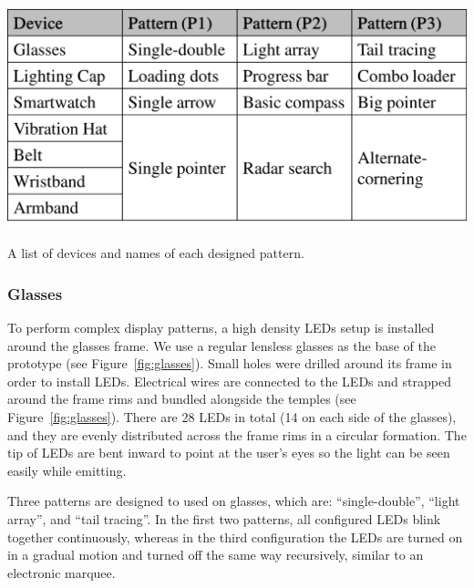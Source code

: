 \documentclass{sigchi}
\begin{document}
\begin{table}
\centering
\includegraphics[width=\columnwidth]{pattern_chart}
\caption{A list of devices and names of each designed pattern.}
\label{tab:pattern_chart}
\end{table}

\subsubsection{Glasses}
To perform complex display patterns, a high density LEDs setup is installed around the glasses frame. We use a regular lensless glasses as the base of the prototype (see Figure~\ref{fig:glasses}). Small holes were drilled around its frame in order to install LEDs. Electrical wires are connected to the LEDs and strapped around the frame rims and bundled alongside the temples (see Figure~\ref{fig:glasses}). There are 28 LEDs in total (14 on each side of the glasses), and they are evenly distributed across the frame rims in a circular formation. The tip of LEDs are bent inward to point at the user's eyes so the light can be seen easily while emitting.

Three patterns are designed to used on glasses, which are: \textquotedblleft single-double\textquotedblright, \textquotedblleft light array\textquotedblright, and \textquotedblleft tail tracing\textquotedblright. In the first two patterns, all configured LEDs blink together continuously, whereas in the third configuration the LEDs are turned on in a gradual motion and turned off the same way recursively, similar to an electronic marquee.
\end{document}
